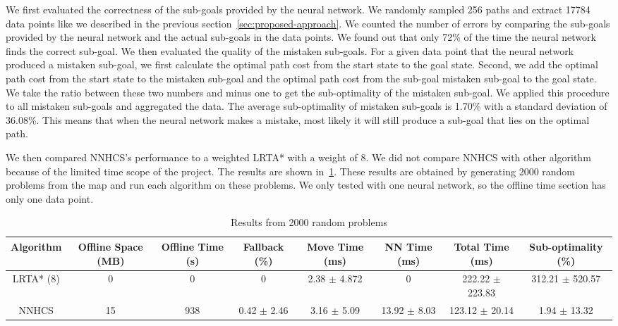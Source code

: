 \documentclass[letterpaper]{article}
\numberwithin{equation}{section}
\numberwithin{theorem}{section}
\numberwithin{lemma}{section}
\numberwithin{df}{section}
\begin{document}
    We first evaluated the correctness of the sub-goals provided by the neural network.
    We randomly sampled 256 paths and extract 17784 data points like we described in the previous section~\ref{sec:proposed-approach}.
    We counted the number of errors by comparing the sub-goals provided by the neural network and the actual sub-goals in the data points.
    We found out that only 72\% of the time the neural network finds the correct sub-goal.
    We then evaluated the quality of the mistaken sub-goals.
    For a given data point that the neural network produced a mistaken sub-goal, we first calculate the optimal path cost from the start state to the goal state.
    Second, we add the optimal path cost from the start state to the mistaken sub-goal and the optimal path cost from the sub-goal mistaken sub-goal to the goal state.
    We take the ratio between these two numbers and minus one to get the sub-optimality of the mistaken sub-goal.
    We applied this procedure to all mistaken sub-goals and aggregated the data.
    The average sub-optimality of mistaken sub-goals is 1.70\% with a standard deviation of 36.08\%.
    This means that when the neural network makes a mistake, most likely it will still produce a sub-goal that lies on the optimal path.

    We then compared NNHCS's performance to a weighted LRTA* with a weight of 8.
    We did not compare NNHCS with other algorithm because of the limited time scope of the project.
    The results are shown in~\ref{tab:table}.
    These results are obtained by generating 2000 random problems from the map and run each algorithm on these problems.
    We only tested with one neural network, so the offline time section has only one data point.

    \begin{table}
        \label{tab:table}
        \scriptsize
        \begin{tabular}{|c|c|c|c|c|c|c|c|}
            \hline
            Algorithm & Offline Space (MB) & Offline Time (s) & Fallback (\%) & Move Time (ms) & NN Time (ms) & Total Time (ms) & Sub-optimality (\%) \\
            \hline
            LRTA* (8) & 0 & 0 & 0 & 2.38 $\pm$ 4.872 & 0 & 222.22 $\pm$ 223.83 & 312.21 $\pm$ 520.57 \\
            \hline
            NNHCS & 15 & 938 & 0.42 $\pm$ 2.46 & 3.16 $\pm$ 5.09 & 13.92 $\pm$ 8.03 & 123.12 $\pm$ 20.14 & 1.94 $\pm$ 13.32 \\
            \hline
        \end{tabular}
        \caption{\small Results from 2000 random problems}
    \end{table}
\end{document}
